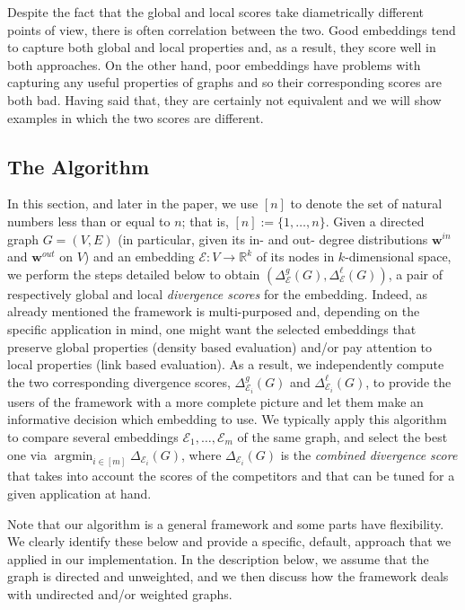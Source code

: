 \documentclass[11pt]{article}
\newcommand{\R}{{\mathbb R}}
\newcommand{\emb}{\mathcal E}
\DeclareMathOperator*{\argmin}{argmin}
\begin{document}
Despite the fact that the global and local scores take diametrically different points of view, there is often correlation between the two. Good embeddings tend to capture both global and local properties and, as a result, they score well in both approaches. On the other hand, poor embeddings have problems with capturing any useful properties of graphs and so their corresponding scores are both bad. Having said that, they are certainly not equivalent and we will show examples in which the two scores are different.

\subsection{The Algorithm}\label{sec:framework2}

In this section, and later in the paper, we use $[n]$ to denote the set of natural numbers less than or equal to $n$; that is, $[n] := \{1, \ldots, n\}$. Given a directed graph $G=(V,E)$ (in particular, given its in- and out- degree distributions $\textbf{w}^{in}$ and $\textbf{w}^{out}$ on $V$) and an embedding $\emb : V \to \R^k$ of its nodes in $k$-dimensional space, we perform the steps detailed below to obtain $(\Delta_\emb^g(G),\Delta_\emb^{\ell}(G))$, a pair of respectively global and local \emph{divergence scores} for the embedding. Indeed, as already mentioned the framework is multi-purposed and, depending on the specific application in mind, one might want the selected embeddings that preserve global properties (density based evaluation) and/or pay attention to local properties (link based evaluation). As a result, we independently compute the two corresponding divergence scores, $\Delta^{g}_{\emb_i}(G)$ and $\Delta^{\ell}_{\emb_i}(G)$, to provide the users of the framework with a more complete picture and let them make an informative decision which embedding to use. We typically apply this algorithm to compare several embeddings $\emb_1,\dots,\emb_m$ of the same graph, and select the best one via $\argmin_{i\in[m]} \Delta_{\emb_i}(G)$, where $\Delta_{\emb_i}(G)$ is the \emph{combined divergence score} that takes into account the scores of the competitors and that can be tuned for a given application at hand.

Note that our algorithm is a general framework and some parts have flexibility. We clearly identify these below and provide a specific, default, approach that we applied in our implementation. In the description below, we assume that the graph is directed and unweighted, and we then discuss how the framework deals with undirected and/or weighted graphs.
\end{document}
